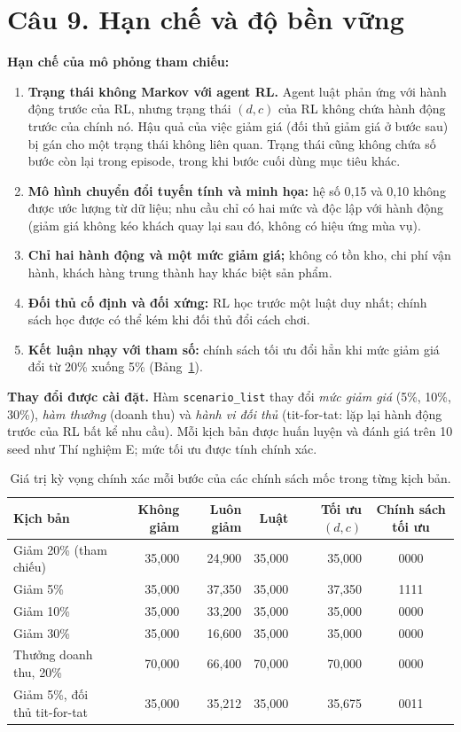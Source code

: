 \documentclass[12pt,a4paper]{report}
\newcommand{\SRC}{"../../src/Agent 02/agent02_experiment.py"}
\newcommand{\CodeLines}[2]{\VerbatimInput[fontsize=\scriptsize,frame=single,
  breaklines=true,numbers=left,numbersep=4pt,firstline=#1,lastline=#2,
  baselinestretch=1.0]{\SRC}}
\begin{document}
\section*{Câu 9. Hạn chế và độ bền vững}
\textbf{Hạn chế của mô phỏng tham chiếu:}
\begin{enumerate}
\item \textbf{Trạng thái không Markov với agent RL.} Agent luật phản ứng với hành
  động trước của RL, nhưng trạng thái $(d,c)$ của RL không chứa hành động trước
  của chính nó. Hậu quả của việc giảm giá (đối thủ giảm giá ở bước sau) bị gán cho
  một trạng thái không liên quan. Trạng thái cũng không chứa số bước còn lại trong
  episode, trong khi bước cuối dùng mục tiêu khác.
\item \textbf{Mô hình chuyển đổi tuyến tính và minh họa:} hệ số 0{,}15 và 0{,}10
  không được ước lượng từ dữ liệu; nhu cầu chỉ có hai mức và độc lập với hành động
  (giảm giá không kéo khách quay lại sau đó, không có hiệu ứng mùa vụ).
\item \textbf{Chỉ hai hành động và một mức giảm giá;} không có tồn kho, chi phí
  vận hành, khách hàng trung thành hay khác biệt sản phẩm.
\item \textbf{Đối thủ cố định và đối xứng:} RL học trước một luật duy nhất; chính
  sách học được có thể kém khi đối thủ đổi cách chơi.
\item \textbf{Kết luận nhạy với tham số:} chính sách tối ưu đổi hẳn khi mức giảm giá
  đổi từ 20\% xuống 5\% (Bảng~\ref{tab:exact}).
\end{enumerate}

\textbf{Thay đổi được cài đặt.} Hàm \texttt{scenario\_list} thay đổi \emph{mức giảm
giá} (5\%, 10\%, 30\%), \emph{hàm thưởng} (doanh thu) và \emph{hành vi đối thủ}
(tit-for-tat: lặp lại hành động trước của RL bất kể nhu cầu). Mỗi kịch bản được huấn
luyện và đánh giá trên 10 seed như Thí nghiệm E; mức tối ưu được tính chính xác.
\CodeLines{1567}{1584}

\begin{table}[H]
\centering
\small
\caption{Giá trị kỳ vọng chính xác mỗi bước của các chính sách mốc trong từng kịch bản.}
\label{tab:exact}
\begin{tabular}{lrrrrc}
\toprule
Kịch bản & Không giảm & Luôn giảm & Luật & Tối ưu $(d,c)$ & Chính sách tối ưu \\
\midrule
Giảm 20\% (tham chiếu) & 35{,}000 & 24{,}900 & 35{,}000 & 35{,}000 & 0000 \\
Giảm 5\% & 35{,}000 & 37{,}350 & 35{,}000 & 37{,}350 & 1111 \\
Giảm 10\% & 35{,}000 & 33{,}200 & 35{,}000 & 35{,}000 & 0000 \\
Giảm 30\% & 35{,}000 & 16{,}600 & 35{,}000 & 35{,}000 & 0000 \\
Thưởng doanh thu, 20\% & 70{,}000 & 66{,}400 & 70{,}000 & 70{,}000 & 0000 \\
Giảm 5\%, đối thủ tit-for-tat & 35{,}000 & 35{,}212 & 35{,}000 & 35{,}675 & 0011 \\
\bottomrule
\end{tabular}
\end{table}
\end{document}
